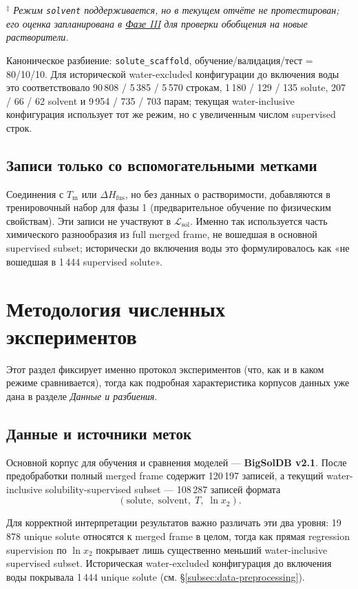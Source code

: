 \documentclass[11pt]{article}
\begin{document}
\textit{$^{\ddagger}$ Режим \texttt{solvent} поддерживается, но в текущем отчёте не протестирован; его оценка запланирована в \hyperref[subsec:roadmap-phase3]{Фазе III} для проверки обобщения на новые растворители.}

Каноническое разбиение: \texttt{solute\_scaffold}, обучение/валидация/тест = 80/10/10. Для исторической water-excluded конфигурации до включения воды это соответствовало 90\,808 / 5\,385 / 5\,570 строкам, 1\,180 / 129 / 135 solute, 207 / 66 / 62 solvent и 9\,954 / 735 / 703 парам; текущая water-inclusive конфигурация использует тот же режим, но с увеличенным числом supervised строк.

\subsection{Записи только со вспомогательными метками}

Соединения с $T_{\mathrm{m}}$ или $\Delta H_{\mathrm{fus}}$, но без данных о растворимости, добавляются в тренировочный набор для фазы 1 (предварительное обучение по физическим свойствам). Эти записи не участвуют в $\mathcal{L}_{\mathrm{sol}}$. Именно так используется часть химического разнообразия из full merged frame, не вошедшая в основной supervised subset; исторически до включения воды это формулировалось как «не вошедшая в 1\,444 supervised solute».

\section{Методология численных экспериментов}

Этот раздел фиксирует именно протокол экспериментов (что, как и в каком режиме сравнивается), тогда как подробная характеристика корпусов данных уже дана в разделе \textit{Данные и разбиения}.

\subsection{Данные и источники меток}

Основной корпус для обучения и сравнения моделей --- \textbf{BigSolDB v2.1}. После предобработки полный merged frame содержит 120\,197 записей, а текущий water-inclusive solubility-supervised subset --- 108\,287 записей формата
\begin{equation*}
(\mathrm{solute},\; \mathrm{solvent},\; T,\; \ln x_2).
\end{equation*}

Для корректной интерпретации результатов важно различать эти два уровня: 19\,878 unique solute относятся к merged frame в целом, тогда как прямая regression supervision по $\ln x_2$ покрывает лишь существенно меньший water-inclusive supervised subset. Историческая water-excluded конфигурация до включения воды покрывала 1\,444 unique solute (см. §\ref{subsec:data-preprocessing}).
\end{document}
